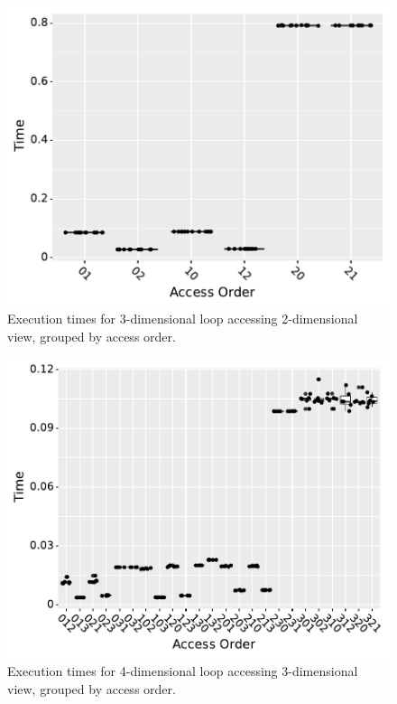\documentclass[sigconf, table]{acmart}
\begin{document}
\begin{figure}
	\includegraphics[width=\columnwidth]{benchmark2_boxplot.pdf}
	\caption{Execution times for 3-dimensional loop accessing 2-dimensional view, grouped by access order.}
	\label{AccessBenchmark2}
\end{figure}

\begin{figure}
	\includegraphics[width=\columnwidth]{benchmark3_boxplot.pdf}
	\caption{Execution times for 4-dimensional loop accessing 3-dimensional view, grouped by access order.}
	\label{AccessBenchmark3}
\end{figure}
\end{document}
